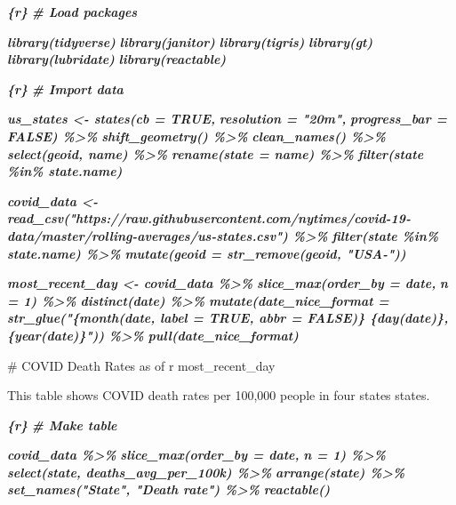 \documentclass[
]{book}
\newenvironment{Shaded}{\begin{snugshade}}{\end{snugshade}}
\newcommand{\FunctionTok}[1]{\textcolor[rgb]{0.00,0.00,0.00}{#1}}
\newcommand{\InformationTok}[1]{\textcolor[rgb]{0.56,0.35,0.01}{\textbf{\textit{#1}}}}
\newcommand{\NormalTok}[1]{#1}
\begin{document}
\begin{Shaded}
\begin{Highlighting}[]
\InformationTok{\textasciigrave{}\textasciigrave{}\textasciigrave{}\{r\}}
\InformationTok{\# Load packages}

\InformationTok{library(tidyverse)}
\InformationTok{library(janitor)}
\InformationTok{library(tigris)}
\InformationTok{library(gt)}
\InformationTok{library(lubridate)}
\InformationTok{library(reactable)}
\InformationTok{\textasciigrave{}\textasciigrave{}\textasciigrave{}}

\InformationTok{\textasciigrave{}\textasciigrave{}\textasciigrave{}\{r\}}
\InformationTok{\# Import data}

\InformationTok{us\_states \textless{}{-} states(cb = TRUE, }
\InformationTok{                    resolution = "20m",}
\InformationTok{                    progress\_bar = FALSE) \%\textgreater{}\%}
\InformationTok{  shift\_geometry() \%\textgreater{}\% }
\InformationTok{  clean\_names() \%\textgreater{}\% }
\InformationTok{  select(geoid, name) \%\textgreater{}\% }
\InformationTok{  rename(state = name) \%\textgreater{}\% }
\InformationTok{  filter(state \%in\% state.name)}

\InformationTok{covid\_data \textless{}{-} read\_csv("https://raw.githubusercontent.com/nytimes/covid{-}19{-}data/master/rolling{-}averages/us{-}states.csv") \%\textgreater{}\% }
\InformationTok{  filter(state \%in\% state.name) \%\textgreater{}\% }
\InformationTok{  mutate(geoid = str\_remove(geoid, "USA{-}")) }

\InformationTok{most\_recent\_day \textless{}{-} covid\_data \%\textgreater{}\% }
\InformationTok{  slice\_max(order\_by = date,}
\InformationTok{            n = 1) \%\textgreater{}\% }
\InformationTok{  distinct(date) \%\textgreater{}\% }
\InformationTok{  mutate(date\_nice\_format = str\_glue("\{month(date, label = TRUE, abbr = FALSE)\} \{day(date)\}, \{year(date)\}")) \%\textgreater{}\% }
\InformationTok{  pull(date\_nice\_format)}
\InformationTok{\textasciigrave{}\textasciigrave{}\textasciigrave{}}

\FunctionTok{\# COVID Death Rates as of \textasciigrave{}r most\_recent\_day\textasciigrave{}}

\NormalTok{This table shows COVID death rates per 100,000 people in four states states.}

\InformationTok{\textasciigrave{}\textasciigrave{}\textasciigrave{}\{r\}}
\InformationTok{\# Make table}

\InformationTok{covid\_data \%\textgreater{}\% }
\InformationTok{  slice\_max(order\_by = date,}
\InformationTok{            n = 1) \%\textgreater{}\%}
\InformationTok{  select(state, deaths\_avg\_per\_100k) \%\textgreater{}\% }
\InformationTok{  arrange(state) \%\textgreater{}\% }
\InformationTok{  set\_names("State", "Death rate") \%\textgreater{}\% }
\InformationTok{  reactable()}
\InformationTok{\textasciigrave{}\textasciigrave{}\textasciigrave{}}


\end{Highlighting}
\end{Shaded}
\end{document}
